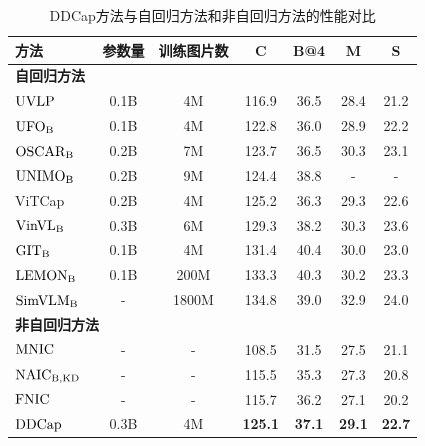 \begin{table}
  \centering
  \caption{DDCap方法与自回归方法和非自回归方法的性能对比}
  \begin{tabular}{lcccccc}
    \toprule
    方法 & 参数量 & 训练图片数 & C & B@4 & M & S\\
    \midrule
    \multicolumn{7}{l}{\textbf{自回归方法}}\\
    \midrule
    $\rm{UVLP}$~\cite{zhou2020unified}  & 0.1B & 4M & 116.9 & 36.5 & 28.4 & 21.2 \\
    $\rm{UFO_B}$~\cite{UFO} & 0.1B & 4M & 122.8 & 36.0 & 28.9 & 22.2 \\
    $\rm{OSCAR_B}$~\cite{OSCAR} & 0.2B & 7M & 123.7 & 36.5 & 30.3 & 23.1\\ 
    $\rm{UNIMO_B}$~\cite{UNIMO}  & 0.2B & 9M & 124.4 &  38.8 & - & - \\
    ViTCap~\cite{ViTCap} & 0.2B & 4M & 125.2 & 36.3 & 29.3 &  22.6 \\
    $\rm{VinVL_B}$~\cite{VinVL} &  0.3B & 6M & 129.3 & 38.2 & 30.3 & 23.6\\ 
    $\rm{GIT_B}$~\cite{GIT} & 0.1B & 4M & 131.4 & 40.4 & 30.0 & 23.0 \\
    $\rm{LEMON_B}$~\cite{LEMON}& 0.1B & 200M& 133.3& 40.3& 30.2& 23.3\\
    $\rm{SimVLM_B}$~\cite{SimVLM}& -& 1800M & 134.8& 39.0& 32.9& 24.0\\ 
    \midrule
    \multicolumn{7}{l}{\textbf{非自回归方法}}\\
    \midrule
        $\rm{MNIC}$~\cite{gao2019masked}  & -  & - & 108.5 & 31.5 & 27.5 & 21.1\\
    $\rm{NAIC_{B,KD}}$~\cite{guo2020non}  & -  & - & 115.5 & 35.3 & 27.3 & 20.8\\
        $\rm{FNIC}$~\cite{fei2019fast}  & -  & - & 115.7 & 36.2 & 27.1 & 20.2\\
            $\rm{DDCap}$  & 0.3B & 4M & \textbf{125.1} & \textbf{37.1} & \textbf{29.1} & \textbf{22.7}\\

\end{tabular}
\end{table}

